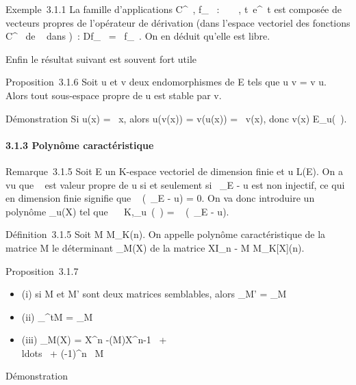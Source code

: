 \documentclass[]{article}
\begin{document}
Exemple~3.1.1 La famille d'applications C^\infty~, f_\lambda~ : ~
\rightarrow~ , t\mapsto~e^\lambda~t est composée de
vecteurs propres de l'opérateur de dérivation (dans l'espace vectoriel
des fonctions C^\infty~ de ~ dans )~: Df_\lambda~ =
\lambda~f_\lambda~. On en déduit qu'elle est libre.

Enfin le résultat suivant est souvent fort utile

Proposition~3.1.6 Soit u et v deux endomorphismes de E tels que u \cdot v =
v \cdot u. Alors tout sous-espace propre de u est stable par v.

Démonstration Si u(x) = \lambda~x, alors u(v(x)) = v(u(x)) = \lambda~v(x), donc v(x) \in
E_u(\lambda~).

\paragraph{3.1.3 Polynôme caractéristique}

Remarque~3.1.5 Soit E un K-espace vectoriel de dimension finie et u \in
L(E). On a vu que \lambda~ est valeur propre de u si et seulement si
\lambda~\mathrmId_E - u est non injectif, ce qui en
dimension finie signifie que
~
(\lambda~\mathrmId_E - u) = 0. On va donc
introduire un polynôme \chi_u(X) tel que
\forall~\lambda~ \in K,\chi_u~(\lambda~)
= ~
(\lambda~\mathrmId_E - u).

Définition~3.1.5 Soit M \in M_K(n). On appelle polynôme
caractéristique de la matrice M le déterminant \chi_M(X) de la
matrice XI_n - M \in M_K[X](n).

Proposition~3.1.7

\begin{itemize}
\itemsep1pt\parskip0pt
\item
  (i) si M et M' sont deux matrices semblables, alors \chi_M' =
  \chi_M
\item
  (ii) \chi_^tM = \chi_M
\item
  (iii) \chi_M(X) = X^n
  -(M)X^n-1~
  + \\ldots~ +
  (-1)^n\
   M
\end{itemize}

Démonstration
\end{document}
